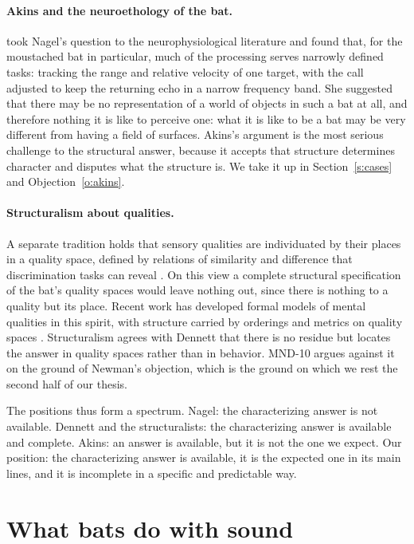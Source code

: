 \documentclass{situationist-preprint}
\begin{document}
\paragraph{Akins and the neuroethology of the bat.} \citet{Akins1993} took Nagel's question to the neurophysiological literature and found that, for the moustached bat in particular, much of the processing serves narrowly defined tasks: tracking the range and relative velocity of one target, with the call adjusted to keep the returning echo in a narrow frequency band. She suggested that there may be no representation of a world of objects in such a bat at all, and therefore nothing it is like to perceive one: what it is like to be a bat may be very different from having a field of surfaces. Akins's argument is the most serious challenge to the structural answer, because it accepts that structure determines character and disputes what the structure is. We take it up in Section~\ref{s:cases} and Objection~\ref{o:akins}.

\paragraph{Structuralism about qualities.} A separate tradition holds that sensory qualities are individuated by their places in a quality space, defined by relations of similarity and difference that discrimination tasks can reveal \citep{Clark1993,Rosenthal2010}. On this view a complete structural specification of the bat's quality spaces would leave nothing out, since there is nothing to a quality but its place. Recent work has developed formal models of mental qualities in this spirit, with structure carried by orderings and metrics on quality spaces \citep{Lee2021}. Structuralism agrees with Dennett that there is no residue but locates the answer in quality spaces rather than in behavior. MND-10 argues against it on the ground of Newman's objection, which is the ground on which we rest the second half of our thesis.

The positions thus form a spectrum. Nagel: the characterizing answer is not available. Dennett and the structuralists: the characterizing answer is available and complete. Akins: an answer is available, but it is not the one we expect. Our position: the characterizing answer is available, it is the expected one in its main lines, and it is incomplete in a specific and predictable way.

\section{What bats do with sound}\label{s:bio}
\end{document}
